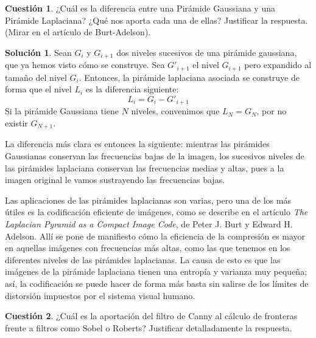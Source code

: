 \documentclass[a4paper, 11pt]{article}
\theoremstyle{definition}
\newtheorem*{solucion}{Solución}
\theoremstyle{theorem}
\newtheorem{cuestion}{Cuestión}
\begin{document}
  \begin{cuestion}
      ¿Cuál es la diferencia entre una Pirámide Gaussiana y una Pirámide Laplaciana? ¿Qué nos aporta cada una de ellas? Justificar la respuesta. (Mirar en el artículo de Burt-Adelson).
  \end{cuestion}

  \begin{solucion}
      Sean $G_i$ y $G_{i+1}$ dos niveles sucesivos de una pirámide gaussiana, que ya hemos visto cómo se construye. Sea $G'_{i+1}$ el nivel $G_{i+1}$ pero expandido al tamaño del nivel $G_i$. Entonces, la pirámide laplaciana asociada se construye de forma que el nivel $L_i$ es la diferencia siguiente:
      \[
      L_i = G_i - G'_{i+1}
      \]
      Si la pirámide Gaussiana tiene $N$ niveles, convenimos que $L_N = G_N$, por no existir $G_{N+1}$.

      La diferencia más clara es entonces la siguiente: mientras las pirámides Gaussianas conservan las frecuencias bajas de la imagen, los sucesivos niveles de las pirámides laplaciana conservan las frecuencias medias y altas, pues a la imagen original le vamos sustrayendo las frecuencias bajas.

      Las aplicaciones de las pirámides laplacianas son varias, pero una de los más útiles es la codificación eficiente de imágenes, como se describe en el artículo \emph{The Laplacian Pyramid as a Compact Image Code}, de Peter J. Burt y Edward H. Adelson. Allí se pone de manifiesto cómo la eficiencia de la compresión es mayor en aquellas imágenes con frecuencias más altas, como las que tenemos en los diferentes niveles de las pirámides laplacianas. La causa de esto es que las imágenes de la pirámide laplaciana tienen una entropía y varianza muy pequeña; así, la codificación se puede hacer de forma más basta sin salirse de los límites de distorsión impuestos por el sistema visual humano.
  \end{solucion}

  \begin{cuestion}
      ¿Cuál es la aportación del filtro de Canny al cálculo de fronteras frente a filtros como Sobel o Roberts? Justificar detalladamente la respuesta.
  \end{cuestion}
\end{document}
